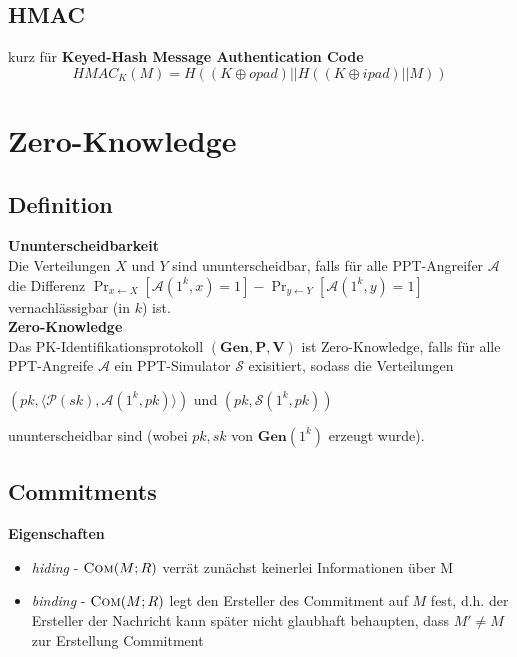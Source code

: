 \documentclass[10pt,a4paper]{article}
\begin{document}
        \subsection{HMAC}
        kurz für \textbf{Keyed-Hash Message Authentication Code} \\
        \[\mathit{HMAC}_{K}(M) = H((K \oplus \mathit{opad}) || H((K \oplus \mathit{ipad}) || M))\]

        
        \section{Zero-Knowledge}
        \subsection{Definition}
        \textbf{Ununterscheidbarkeit}\\
        Die Verteilungen \(X\) und \(Y\) sind ununterscheidbar, falls für alle PPT-Angreifer
        \(\mathcal{A}\) die Differenz
        \(\Pr_{x \leftarrow X}[\mathcal{A}(1^k, x) = 1] - \Pr_{y \leftarrow Y}[\mathcal{A}(1^k, y) = 1]\)
        vernachlässigbar (in \(k\)) ist.\\
        \textbf{Zero-Knowledge}\\
        Das PK-Identifikationsprotokoll \((\mathbf{Gen}, \mathbf{P}, \mathbf{V})\) ist Zero-Knowledge, falls für alle
        PPT-Angreife \(\mathcal{A}\) ein PPT-Simulator \(\mathcal{S}\) exisitiert, sodass die Verteilungen\\
        \begin{center}
          \((\mathit{pk}, \langle\mathcal{P}(\mathit{sk}),\mathcal{A}(1^k, \mathit{pk})\rangle)\)
          und
          \((\mathit{pk}, \mathcal{S}(1^k, \mathit{pk}))\)
        \end{center}
        ununterscheidbar sind (wobei \(\mathit{pk}, \mathit{sk}\) von \(\mathbf{Gen}(1^k)\) erzeugt wurde).
        \subsection{Commitments}
        \textbf{Eigenschaften}
        \begin{itemize}
        \item \textit{hiding} - \(\textsc{Com}(M; R)\) verrät zunächst keinerlei Informationen über M
        \item \textit{binding} - \(\textsc{Com}(M; R)\) legt den Ersteller des Commitment auf \(M\) fest, d.h.
          der Ersteller der Nachricht kann später nicht glaubhaft behaupten, dass \(M' \neq M\) zur Erstellung
          Commitment
        \end{itemize}
        
\end{document}
